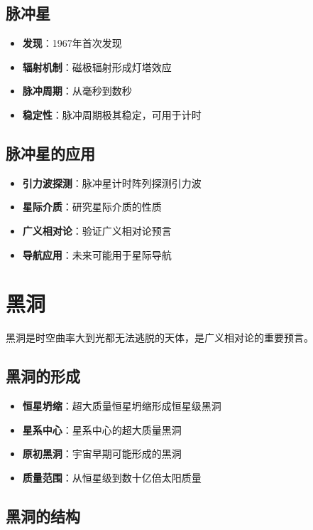 \documentclass[12pt,UTF8]{ctexbook}
\begin{document}
\subsection{脉冲星}

\begin{itemize}
  \item \textbf{发现}：1967年首次发现
  \item \textbf{辐射机制}：磁极辐射形成灯塔效应
  \item \textbf{脉冲周期}：从毫秒到数秒
  \item \textbf{稳定性}：脉冲周期极其稳定，可用于计时
\end{itemize}

\subsection{脉冲星的应用}

\begin{itemize}
  \item \textbf{引力波探测}：脉冲星计时阵列探测引力波
  \item \textbf{星际介质}：研究星际介质的性质
  \item \textbf{广义相对论}：验证广义相对论预言
  \item \textbf{导航应用}：未来可能用于星际导航
\end{itemize}

\section{黑洞}

黑洞是时空曲率大到光都无法逃脱的天体，是广义相对论的重要预言。

\subsection{黑洞的形成}

\begin{itemize}
  \item \textbf{恒星坍缩}：超大质量恒星坍缩形成恒星级黑洞
  \item \textbf{星系中心}：星系中心的超大质量黑洞
  \item \textbf{原初黑洞}：宇宙早期可能形成的黑洞
  \item \textbf{质量范围}：从恒星级到数十亿倍太阳质量
\end{itemize}

\subsection{黑洞的结构}
\end{document}
